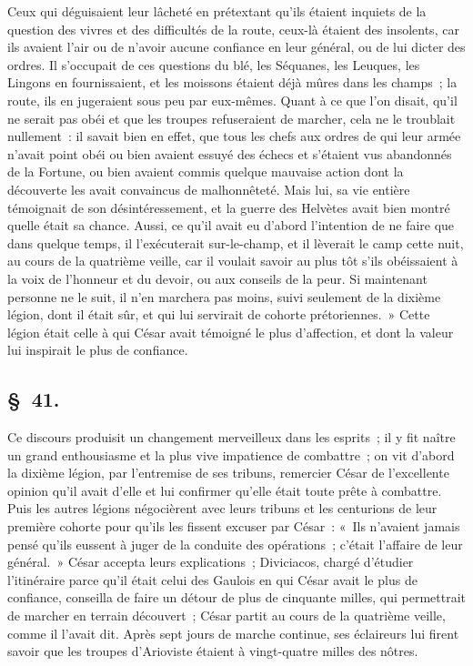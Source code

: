 \documentclass[french,twoside]{book} %
\begin{document}
\par
Ceux qui déguisaient leur lâcheté en prétextant qu’ils étaient inquiets de la question des vivres et des difficultés de la route, ceux-là étaient des insolents, car ils avaient l’air ou de n’avoir aucune confiance en leur général, ou de lui dicter des ordres. Il s’occupait de ces questions du blé, les Séquanes, les Leuques, les Lingons en fournissaient, et les moissons étaient déjà mûres dans les champs ; la route, ils en jugeraient sous peu par eux-mêmes. Quant à ce que l’on disait, qu’il ne serait pas obéi et que les troupes refuseraient de marcher, cela ne le troublait nullement : il savait bien en effet, que tous les chefs aux ordres de qui leur armée n’avait point obéi ou bien avaient essuyé des échecs et s’étaient vus abandonnés de la Fortune, ou bien avaient commis quelque mauvaise action dont la découverte les avait convaincus de malhonnêteté. Mais lui, sa vie entière témoignait de son désintéressement, et la guerre des Helvètes avait bien montré quelle était sa chance. Aussi, ce qu’il avait eu d’abord l’intention de ne faire que dans quelque temps, il l’exécuterait sur-le-champ, et il lèverait le camp cette nuit, au cours de la quatrième veille, car il voulait savoir au plus tôt s’ils obéissaient à la voix de l’honneur et du devoir, ou aux conseils de la peur. Si maintenant personne ne le suit, il n’en marchera pas moins, suivi seulement de la dixième légion, dont il était sûr, et qui lui servirait de cohorte prétoriennes. » Cette légion était celle à qui César avait témoigné le plus d’affection, et dont la valeur lui inspirait le plus de confiance.
\subsection[{§ 41.}]{ \textsc{§ 41.} }
\noindent Ce discours produisit un changement merveilleux dans les esprits ; il y fit naître un grand enthousiasme et la plus vive impatience de combattre ; on vit d’abord la dixième légion, par l’entremise de ses tribuns, remercier César de l’excellente opinion qu’il avait d’elle et lui confirmer qu’elle était toute prête à combattre. Puis les autres légions négocièrent avec leurs tribuns et les centurions de leur première cohorte pour qu’ils les fissent excuser par César : « Ils n’avaient jamais pensé qu’ils eussent à juger de la conduite des opérations ; c’était l’affaire de leur général. » César accepta leurs explications ; Diviciacos, chargé d’étudier l’itinéraire parce qu’il était celui des Gaulois en qui César avait le plus de confiance, conseilla de faire un détour de plus de cinquante milles, qui permettrait de marcher en terrain découvert ; César partit au cours de la quatrième veille, comme il l’avait dit. Après sept jours de marche continue, ses éclaireurs lui firent savoir que les troupes d’Arioviste étaient à vingt-quatre milles des nôtres.
\end{document}
